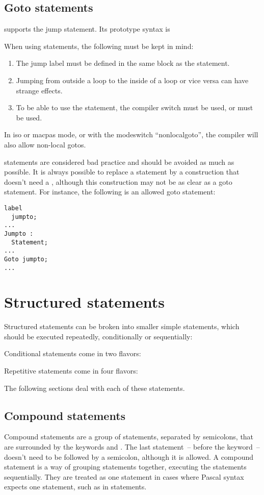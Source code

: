 \subsection{Goto statements}
\fpc supports the  jump statement. Its prototype syntax is

When using  statements, the following must be kept in mind:
\begin{enumerate}
\item The jump label must be defined in the same block as the 
statement.
\item Jumping from outside a loop to the inside of a loop or vice versa can
 have strange effects.
\item To be able to use the  statement, the  compiler
switch must be used, or  must be used.
\end{enumerate}
\begin{remark}
In iso or macpas mode, or with the modeswitch ``nonlocalgoto'', the compiler
will also allow non-local gotos.
\end{remark}
 statements are considered bad practice and should be avoided as
much as possible. It is always possible to replace a  statement by a
construction that doesn't need a , although this construction may
not be as clear as a goto statement.
For instance, the following is an allowed goto statement:
\begin{verbatim}
label
  jumpto;
...
Jumpto :
  Statement;
...
Goto jumpto;
...
\end{verbatim}

\section{Structured statements}
Structured statements can be broken into smaller simple statements, which
should be executed repeatedly, conditionally  or sequentially:

Conditional statements come in two flavors:

Repetitive statements come in four flavors:

The following sections deal with each of these statements.

\subsection{Compound statements}
 
Compound statements are a group of statements, separated by semicolons,
that are surrounded by the keywords  and . The
last statement~-- before the  keyword~-- doesn't need to be followed by a semicolon, although it is
allowed. A compound statement is a way of grouping statements together,
executing the statements sequentially. They are treated as one statement
in cases where Pascal syntax expects one statement, such as in
 statements.


